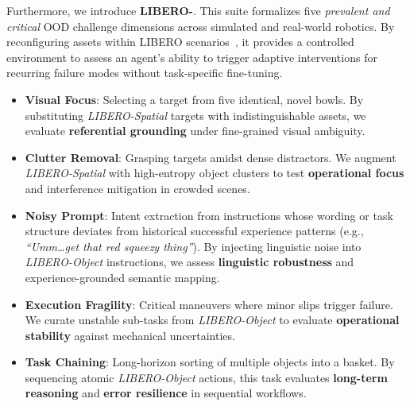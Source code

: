 Furthermore, we introduce \textbf{LIBERO-{\sys}}. This suite formalizes five \textit{prevalent and critical} OOD challenge dimensions across simulated and real-world robotics. By reconfiguring assets within LIBERO scenarios~\cite{libero_ref}, it provides a controlled environment to assess an agent's ability to trigger adaptive interventions for recurring failure modes without task-specific fine-tuning.


\begin{itemize}
    \item \textbf{Visual Focus}: Selecting a target from five identical, novel bowls. By substituting \textit{LIBERO-Spatial} targets with indistinguishable assets, we evaluate \textbf{referential grounding} under fine-grained visual ambiguity.

    \item \textbf{Clutter Removal}: Grasping targets amidst dense distractors. We augment \textit{LIBERO-Spatial} with high-entropy object clusters to test \textbf{operational focus} and interference mitigation in crowded scenes.

    \item \textbf{Noisy Prompt}: {\color{black}Intent extraction from instructions whose wording or task structure deviates from historical successful experience patterns} (e.g., \textit{``Umm\ldots get that red squeezy thing''}). By injecting linguistic noise into \textit{LIBERO-Object} instructions, we assess \textbf{linguistic robustness} and {\color{black}experience-grounded semantic mapping}.

    \item \textbf{Execution Fragility}: Critical maneuvers where minor slips trigger failure. We curate unstable sub-tasks from \textit{LIBERO-Object} to evaluate \textbf{operational stability} against mechanical uncertainties.

    \item \textbf{Task Chaining}: Long-horizon sorting of multiple objects into a basket. By sequencing atomic \textit{LIBERO-Object} actions, this task evaluates \textbf{long-term reasoning} and \textbf{error resilience} in sequential workflows.
\end{itemize}


